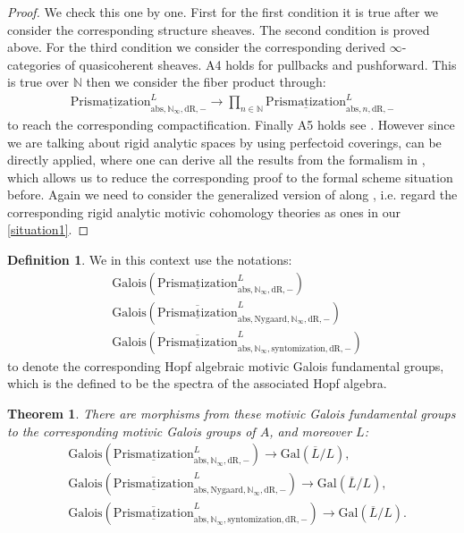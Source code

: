 \documentclass[12pt]{article}
\newtheorem{theorem}{Theorem}
\theoremstyle{definition}
\newtheorem{definition}{Definition}
\begin{document}
\begin{proof}
We check this one by one. First for the first condition it is true after we consider the corresponding structure sheaves. The second condition is proved above. For the third condition we consider the corresponding derived $\infty$-categories of quasicoherent sheaves. A4 holds for pullbacks and pushforward. This is true over $\mathbb{N}$ then we consider the fiber product through:
\begin{align}
{\underline{\mathrm{Prismatization}}}^L_{\mathrm{abs},\mathbb{N}_\infty,\mathrm{dR},-}\rightarrow  \prod_{n\in \mathbb{N}} {\underline{\mathrm{Prismatization}}}^L_{\mathrm{abs},n,\mathrm{dR},-}
\end{align}
to reach the corresponding compactification. Finally A5 holds see \cite[Chapter 4, in particular 4.7, 4.8, 4.9, 4.10]{3A}. However since we are talking about rigid analytic spaces by using perfectoid coverings, \cite{3A} can be directly applied, where one can derive all the results from the formalism in \cite{3A}, which allows us to reduce the corresponding proof to the formal scheme situation before. Again we need to consider the generalized version of \cite{3A} along \cite{3S}, i.e. regard the corresponding rigid analytic motivic cohomology theories as ones in our \cref{situation1}.
\end{proof}


\begin{definition}
We in this context use the notations:
\begin{align}
&\mathrm{Galois}(\underline{\mathrm{Prismatization}}^L_{\mathrm{abs},\mathbb{N}_\infty,\mathrm{dR},-})\\
&\mathrm{Galois}(\overline{\underline{\mathrm{Prismatization}}}^L_{\mathrm{abs},\mathrm{Nygaard},\mathbb{N}_\infty,\mathrm{dR},-})\\
&\mathrm{Galois}(\overline{\underline{\mathrm{Prismatization}}}^L_{\mathrm{abs},\mathbb{N}_\infty,\mathrm{syntomization},\mathrm{dR},-})
\end{align}
to denote the corresponding Hopf algebraic motivic Galois fundamental groups, which is the defined to be the spectra of the associated Hopf algebra.
\end{definition}


\begin{theorem}
There are morphisms from these motivic Galois fundamental groups to the corresponding motivic Galois groups of $A$, and moreover $L$: 
\begin{align}
&\mathrm{Galois}(\underline{\mathrm{Prismatization}}^L_{\mathrm{abs},\mathbb{N}_\infty,\mathrm{dR},-})\rightarrow \mathrm{Gal}(\overline{L}/L),\\
&\mathrm{Galois}(\overline{\underline{\mathrm{Prismatization}}}^L_{\mathrm{abs},\mathrm{Nygaard},\mathbb{N}_\infty,\mathrm{dR},-})\rightarrow \mathrm{Gal}(\overline{L}/L),\\
&\mathrm{Galois}(\overline{\underline{\mathrm{Prismatization}}}^L_{\mathrm{abs},\mathbb{N}_\infty,\mathrm{syntomization},\mathrm{dR},-})\rightarrow \mathrm{Gal}(\overline{L}/L).
\end{align}
\end{theorem}
\end{document}
